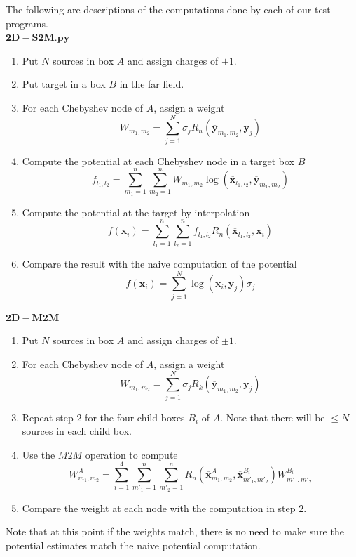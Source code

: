\documentclass[11pt, oneside]{article}   	%
\begin{document}
\begin{appendices}
The following are descriptions of the computations done by each of our test programs.\\
$\mathbf{2D-S2M.py}$
\begin{enumerate}
\item Put $N$ sources in box $A$ and assign charges of $\pm 1$.
\item Put target in a box $B$ in the far field.
\item For each Chebyshev node of $A$, assign a weight\\
$$W_{m_1,m_2}=\sum_{j=1}^N \sigma_j R_n(\mathbf{\overline{y}}_{m_1,m_2},\mathbf{y}_j)$$
\item Compute the potential at each Chebyshev node in a target box $B$\\
$$f_{l_1,l_2}=\sum_{m_1=1}^n\sum_{m_2=1}^n W_{m_1,m_2} \log(\mathbf{\overline{x}}_{l_1,l_2},\mathbf{\overline{y}}_{m_1,m_2})$$
\item Compute the potential at the target by interpolation\\
$$f(\mathbf{x}_i)=\sum_{l_1=1}^n\sum_{l_2=1}^n f_{l_1,l_2} R_n(\mathbf{\overline{x}}_{l_1,l_2},\mathbf{x}_i)$$
\item Compare the result with the naive computation of the potential\\
$$f(\mathbf{x}_i)=\sum_{j=1}^N \log(\mathbf{x}_i,\mathbf{y}_j) \sigma_j$$
\end{enumerate}

$\mathbf{2D-M2M}$
\begin{enumerate}
\item Put $N$ sources in box $A$ and assign charges of $\pm 1$.
\item For each Chebyshev node of $A$, assign a weight\\
$$W_{m_1,m_2}=\sum_{j=1}^N \sigma_jR_k(\mathbf{\overline{y}}_{m_1,m_2},\mathbf{y}_j)$$
\item Repeat step $2$ for the four child boxes $B_i$ of $A$. Note that there will be $\le N$ sources in each child box.
\item Use the $M2M$ operation to compute\\
$$W^A_{m_1,m_2}= \sum_{i=1}^4\sum_{m'_1=1}^n\sum_{m'_2=1}^n R_n(\mathbf{\overline{x}}^{A}_{m_1,m_2},\mathbf{\overline{x}}^{B_i}_{m'_1,m'_2})W^{B_i}_{m'_1,m'_2}$$
\item Compare the weight at each node with the computation in step $2$.
\end{enumerate}
Note that at this point if the weights match, there is no need to make sure the potential estimates match the naive potential computation.\\


\end{appendices}
\end{document}
